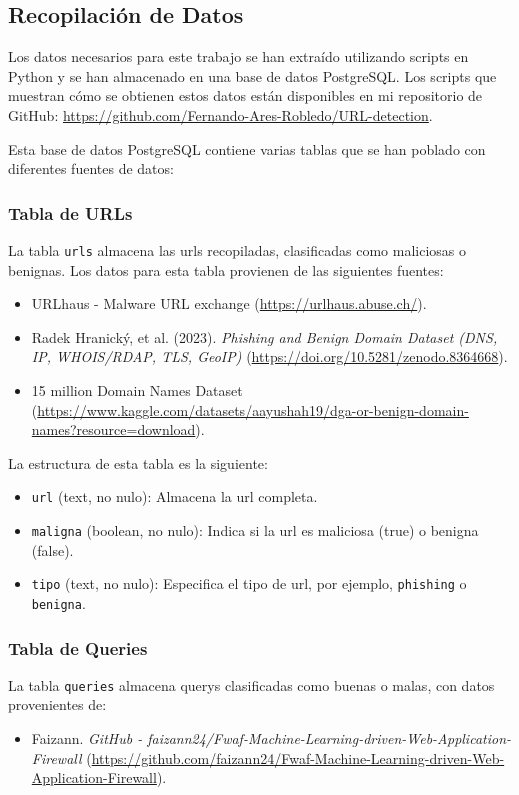 \subsection{Recopilación de Datos}

Los datos necesarios para este trabajo se han extraído utilizando \glspl{script} en Python y se han almacenado en una base de datos PostgreSQL. Los \glspl{script} que muestran cómo se obtienen estos datos están disponibles en mi repositorio de GitHub: \url{https://github.com/Fernando-Ares-Robledo/URL-detection}.

Esta base de datos PostgreSQL contiene varias tablas que se han poblado con diferentes fuentes de datos:

\subsubsection*{Tabla de URLs}
La tabla \texttt{urls} almacena las \glspl{url} recopiladas, clasificadas como maliciosas o benignas. Los datos para esta tabla provienen de las siguientes fuentes:
\begin{itemize}
    \item URLhaus - Malware URL exchange (\url{https://urlhaus.abuse.ch/}).
    \item Radek Hranický, et al. (2023). \textit{Phishing and Benign Domain Dataset (DNS, IP, WHOIS/RDAP, TLS, GeoIP)} (\url{https://doi.org/10.5281/zenodo.8364668}).
    \item 15 million Domain Names Dataset (\url{https://www.kaggle.com/datasets/aayushah19/dga-or-benign-domain-names?resource=download}).
\end{itemize}

La estructura de esta tabla es la siguiente:
\begin{itemize}
    \item \texttt{url} (text, no nulo): Almacena la \gls{url} completa.
    \item \texttt{maligna} (boolean, no nulo): Indica si la \gls{url} es maliciosa (true) o benigna (false).
    \item \texttt{tipo} (text, no nulo): Especifica el tipo de \gls{url}, por ejemplo, \texttt{phishing} o \texttt{benigna}.
\end{itemize}

\subsubsection*{Tabla de Queries}
La tabla \texttt{queries} almacena \glspl{query} clasificadas como buenas o malas, con datos provenientes de:
\begin{itemize}
    \item Faizann. \textit{GitHub - faizann24/Fwaf-Machine-Learning-driven-Web-Application-Firewall} (\url{https://github.com/faizann24/Fwaf-Machine-Learning-driven-Web-Application-Firewall}).
\end{itemize}

